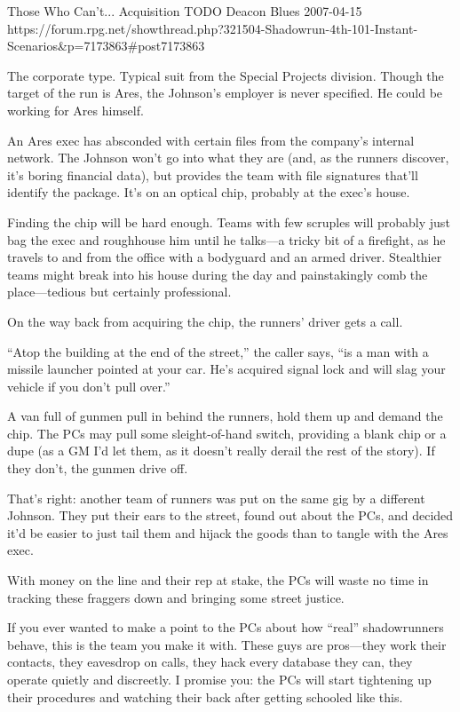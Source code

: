 \begin{scenario}{Those Who Can't...}
	{Acquisition}
	{TODO}
	{Deacon Blues}
	{2007-04-15}
	{https://forum.rpg.net/showthread.php?321504-Shadowrun-4th-101-Instant-Scenarios\&p=7173863\#post7173863}

 The corporate type. Typical suit from the Special Projects division. Though the target of the run is Ares, the Johnson's employer is never specified. He could be working for Ares himself.

\synopsis An Ares exec has absconded with certain files from the company's internal network. The Johnson won't go into what they are (and, as the runners discover, it's boring financial data), but provides the team with file signatures that'll identify the package. It's on an optical chip, probably at the exec's house.

Finding the chip will be hard enough. Teams with few scruples will probably just bag the exec and roughhouse him until he talks---a tricky bit of a firefight, as he travels to and from the office with a bodyguard and an armed driver. Stealthier teams might break into his house during the day and painstakingly comb the place---tedious but certainly professional.

\twist On the way back from acquiring the chip, the runners' driver gets a call.

``Atop the building at the end of the street,'' the caller says, ``is a man with a missile launcher pointed at your car. He's acquired signal lock and will slag your vehicle if you don't pull over.''

A van full of gunmen pull in behind the runners, hold them up and demand the chip. The PCs may pull some sleight-of-hand switch, providing a blank chip or a dupe (as a GM I'd let them, as it doesn't really derail the rest of the story). If they don't, the gunmen drive off.

That's right: another team of runners was put on the same gig by a different Johnson. They put their ears to the street, found out about the PCs, and decided it'd be easier to just tail them and hijack the goods than to tangle with the Ares exec.

With money on the line and their rep at stake, the PCs will waste no time in tracking these fraggers down and bringing some street justice.

\notes  If you ever wanted to make a point to the PCs about how ``real'' shadowrunners behave, this is the team you make it with. These guys are pros---they work their contacts, they eavesdrop on calls, they hack every database they can, they operate quietly and discreetly. I promise you: the PCs will start tightening up their procedures and watching their back after getting schooled like this. 

\end{scenario}